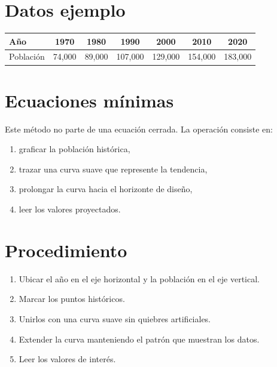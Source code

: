 \documentclass[12pt]{article}
\begin{document}

\section{Datos ejemplo}
\begin{center}
\begin{tabular}{lcccccc}
\toprule
Año & 1970 & 1980 & 1990 & 2000 & 2010 & 2020 \\
\midrule
Población & 74,000 & 89,000 & 107,000 & 129,000 & 154,000 & 183,000 \\
\bottomrule
\end{tabular}
\end{center}

\section{Ecuaciones mínimas}
Este método no parte de una ecuación cerrada. La operación consiste en:
\begin{enumerate}
\item graficar la población histórica,
\item trazar una curva suave que represente la tendencia,
\item prolongar la curva hacia el horizonte de diseño,
\item leer los valores proyectados.
\end{enumerate}

\section{Procedimiento}
\begin{enumerate}
\item Ubicar el año en el eje horizontal y la población en el eje vertical.
\item Marcar los puntos históricos.
\item Unirlos con una curva suave sin quiebres artificiales.
\item Extender la curva manteniendo el patrón que muestran los datos.
\item Leer los valores de interés.
\end{enumerate}
\end{document}
